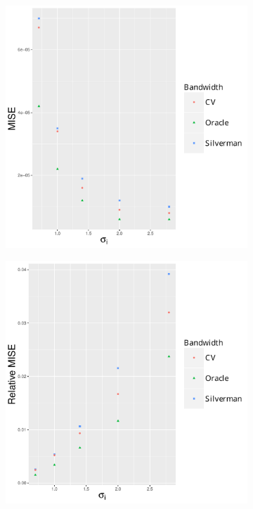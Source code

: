 \begin{figure}[htbp]
    \centering
    \begin{subfigure}[t]{0.24\textwidth}
        \includegraphics[width=\textwidth]{results/by_cases_spread/MISE-vs-risk-spread}
        \caption{}
        \label{fig:ise:unif_Spreads_1h:mise}
    \end{subfigure}
    \begin{subfigure}[t]{0.24\textwidth}
        \includegraphics[width=\textwidth]{results/by_cases_spread/RMISE-vs-risk-spread}

\end{subfigure}
\end{figure}
